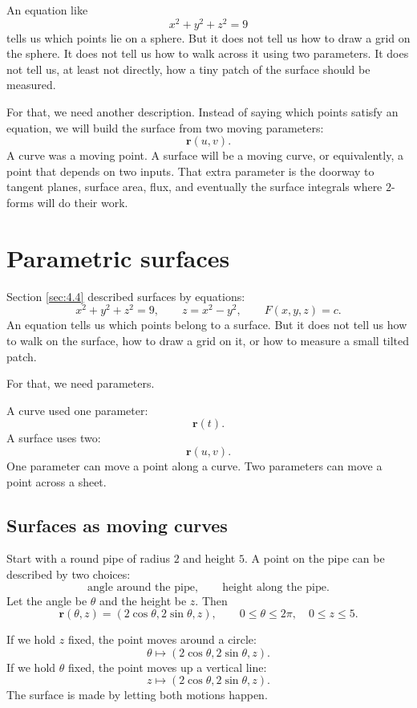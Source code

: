 An equation like
\[
    x^2+y^2+z^2=9
\]
tells us which points lie on a sphere.  But it does not tell us how to draw a grid on the
sphere.  It does not tell us how to walk across it using two parameters.  It does not tell
us, at least not directly, how a tiny patch of the surface should be measured.

For that, we need another description.  Instead of saying which points satisfy an equation,
we will build the surface from two moving parameters:
\[
    \mathbf r(u,v).
\]
A curve was a moving point.  A surface will be a moving curve, or equivalently, a point
that depends on two inputs.  That extra parameter is the doorway to tangent planes,
surface area, flux, and eventually the surface integrals where \(2\)-forms will do their
work.
\section{Parametric surfaces}
\label{sec:4.5}

Section \ref{sec:4.4} described surfaces by equations:
\[
    x^2+y^2+z^2=9,
    \qquad
    z=x^2-y^2,
    \qquad
    F(x,y,z)=c.
\]
An equation tells us which points belong to a surface.  But it does not tell us how to
walk on the surface, how to draw a grid on it, or how to measure a small tilted patch.

For that, we need parameters.

A curve used one parameter:
\[
    \mathbf r(t).
\]
A surface uses two:
\[
    \mathbf r(u,v).
\]
One parameter can move a point along a curve.  Two parameters can move a point across
a sheet.

\subsection{Surfaces as moving curves}

Start with a round pipe of radius \(2\) and height \(5\).  A point on the pipe can be
described by two choices:
\[
    \text{angle around the pipe},\qquad
    \text{height along the pipe}.
\]
Let the angle be \(\theta\) and the height be \(z\).  Then
\[
    \mathbf r(\theta,z)
    =
    (2\cos\theta,2\sin\theta,z),
    \qquad
    0\le \theta\le2\pi,\quad 0\le z\le5.
\]

If we hold \(z\) fixed, the point moves around a circle:
\[
    \theta\mapsto (2\cos\theta,2\sin\theta,z).
\]
If we hold \(\theta\) fixed, the point moves up a vertical line:
\[
    z\mapsto (2\cos\theta,2\sin\theta,z).
\]
The surface is made by letting both motions happen.

